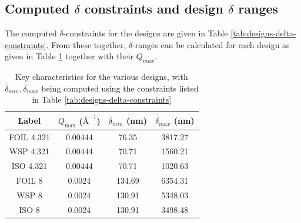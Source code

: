 \documentclass{article}
\begin{document}
\subsection{Computed $\delta$ constraints and design $\delta$ ranges}
\label{c4.2}
The computed $\delta$-constraints for the designs are given in Table \ref{tab:designs-delta-constraints}. From these together, $\delta$-ranges can be calculated for each design as given in Table \ref{tab:designs-final-ranges} together with their $Q_{max}$. %
\begin{table}[h!]
	\centering
	\begin{tabular}{c c c c}
		\toprule
		Label & $Q_{\text{max}}$ ($\text{\AA}^{-1}$) & $\delta_{min}$ (nm) & $\delta_{max}$ (nm) \\
		\midrule
		FOIL 4.321 & 0.00444 & 76.35 & 3817.27 \\
		WSP 4.321 & 0.00444 & 70.71 & 1560.21 \\
		ISO 4.321 & 0.00444 & 70.71 & 1020.63 \\
		FOIL 8 & 0.0024 & 134.69 & 6354.31 \\
		WSP 8 & 0.0024 & 130.91 & 5348.03 \\
		ISO 8 & 0.0024 & 130.91 & 3498.48 \\
		\bottomrule
	\end{tabular}
	\caption{Key characteristics for the various designs, with $\delta_{min}, \delta_{max}$ being computed using the constraints listed in Table \ref{tab:designs-delta-constraints}}
	\label{tab:designs-final-ranges}
\end{table}
\end{document}
